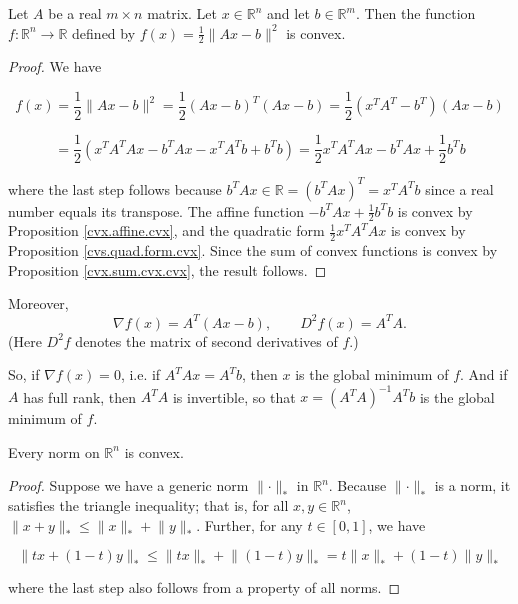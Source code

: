 \begin{proposition}\label{cvx.least.squares.cvx}
Let $A$ be a real $m\times n$ matrix. Let $x\in\mathbb{R}^{n}$ and let $b\in\mathbb{R}^{m}$. Then the function $f\colon\mathbb{R}^{n}\to\mathbb{R}$ defined by $f(x)=\frac{1}{2}\lVert Ax-b\rVert ^{2}$ is convex.


\end{proposition}

\begin{proof}



We have

\[
f(x) = \frac{1}{2} \lVert Ax - b \rVert^2 = \frac{1}{2} (Ax - b)^T (Ax -b) = \frac{1}{2} (x^TA^T - b^T)(Ax -b) 
\]

\[
= \frac{1}{2} (x^TA^TAx  - b^TAx   - x^TA^Tb + b^T b) = \frac{1}{2} x^TA^TAx  - b^TAx + \frac{1}{2}b^T b
\]

where the last step follows because \(b^TAx \in \mathbb{R} = (b^TAx)^T =  x^TA^Tb \) since a real number equals its transpose. The affine function \( - b^TAx + \frac{1}{2}b^T b\) is convex by Proposition \ref{cvx.affine.cvx}, and the quadratic form \( \frac{1}{2} x^TA^TAx \) is convex by Proposition \ref{cvs.quad.form.cvx}. Since the sum of convex functions is convex by Proposition \ref{cvx.sum.cvx.cvx}, the result follows.


\end{proof}

\begin{remark} Moreover,
$$\nabla f(x)=A^{T}(Ax-b),\qquad D^{2}f(x)=A^{T}A.$$
(Here $D^{2}f$ denotes the matrix of second derivatives of $f$.)

So, if $\nabla f(x)=0$, i.e. if $A^{T}Ax=A^{T}b$, then $x$ is the global minimum of $f$.  And if $A$ has full rank, then $A^{T}A$ is invertible, so that $x=(A^{T}A)^{-1}A^{T}b$ is the global minimum of $f$.
\end{remark}

\begin{proposition}\label{cvx.norm.cvx}Every norm on \(\mathbb{R}^n\) is convex. 

\end{proposition}

\begin{proof}Suppose we have a generic norm \(\lVert \cdot \rVert_*\) in \(\mathbb{R}^n\). Because  \(\lVert \cdot \rVert_*\) is a norm, it satisfies the triangle inequality; that is, for all \(x, y \in \mathbb{R}^n\),\(\lVert x + y \rVert_* \leq \lVert x  \rVert_*  + \lVert  y \rVert_*\). Further, for any \(t \in [0,1]\), we have


\[
\lVert tx + (1-t)y \rVert_* \leq \lVert tx  \rVert_*  + \lVert(1-t)  y \rVert_* =  t\lVert x  \rVert_*  +  (1-t) \lVert y \rVert_*
\]

where the last step also follows from a property of all norms.


\end{proof}

